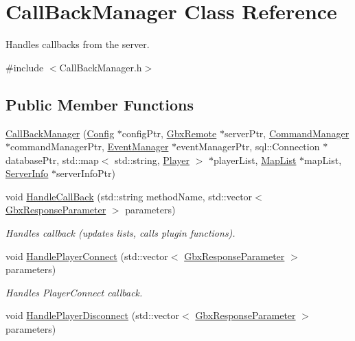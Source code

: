 \hypertarget{classCallBackManager}{\section{Call\-Back\-Manager Class Reference}
\label{classCallBackManager}
}


Handles callbacks from the server.  




{\ttfamily \#include $<$Call\-Back\-Manager.\-h$>$}

\subsection*{Public Member Functions}
\begin{DoxyCompactItemize}
\item 
\hyperlink{classCallBackManager_aaba17921501672d9c0eb321a05b81519}{Call\-Back\-Manager} (\hyperlink{classConfig}{Config} $\ast$config\-Ptr, \hyperlink{classGbxRemote}{Gbx\-Remote} $\ast$server\-Ptr, \hyperlink{classCommandManager}{Command\-Manager} $\ast$command\-Manager\-Ptr, \hyperlink{classEventManager}{Event\-Manager} $\ast$event\-Manager\-Ptr, sql\-::\-Connection $\ast$database\-Ptr, std\-::map$<$ std\-::string, \hyperlink{structPlayer}{Player} $>$ $\ast$player\-List, \hyperlink{classMapList}{Map\-List} $\ast$map\-List, \hyperlink{structServerInfo}{Server\-Info} $\ast$server\-Info\-Ptr)
\item 
void \hyperlink{classCallBackManager_a8af5305f668aae4c563e7039b99015c2}{Handle\-Call\-Back} (std\-::string method\-Name, std\-::vector$<$ \hyperlink{classGbxResponseParameter}{Gbx\-Response\-Parameter} $>$ parameters)
\begin{DoxyCompactList}\small\item\em Handles callback (updates lists, calls plugin functions). \end{DoxyCompactList}\item 
void \hyperlink{classCallBackManager_a48e888c80841cf757ebdd69726a8aed5}{Handle\-Player\-Connect} (std\-::vector$<$ \hyperlink{classGbxResponseParameter}{Gbx\-Response\-Parameter} $>$ parameters)
\begin{DoxyCompactList}\small\item\em Handles Player\-Connect callback. \end{DoxyCompactList}\item 
void \hyperlink{classCallBackManager_aa762cbece4e59d8395f5dbd857c53f17}{Handle\-Player\-Disconnect} (std\-::vector$<$ \hyperlink{classGbxResponseParameter}{Gbx\-Response\-Parameter} $>$ parameters)

\end{DoxyCompactItemize}
